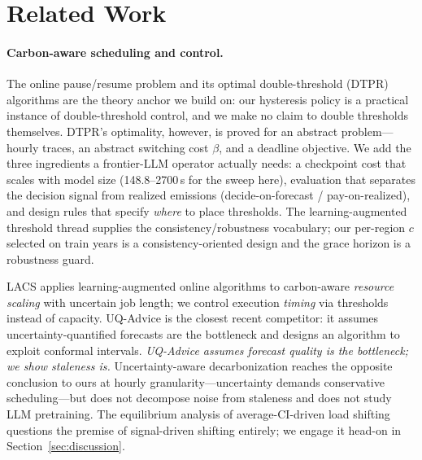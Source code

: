 \documentclass[sigconf,nonacm=false]{acmart}
\begin{document}
\section{Related Work}
\label{sec:related}

\paragraph{Carbon-aware scheduling and control.}
The online pause/resume problem and its optimal double-threshold (DTPR)
algorithms \cite{lechowicz2023opr} are the theory anchor we build on: our
hysteresis policy is a practical instance of double-threshold control, and we
make no claim to double thresholds themselves. DTPR's optimality, however, is
proved for an abstract problem---hourly traces, an abstract switching cost
$\beta$, and a deadline objective. We add the three ingredients a frontier-LLM
operator actually needs: a checkpoint cost that scales with model size
(148.8--2700\,s for the sweep here), evaluation that separates the decision signal
from realized emissions (decide-on-forecast / pay-on-realized), and design rules
that specify \emph{where} to place thresholds. The learning-augmented threshold
thread \cite{lechowicz2024ocs,lykouris2021caching,lechowicz2025stclip} supplies
the consistency/robustness vocabulary; our per-region $c$ selected on train years
is a consistency-oriented design and the grace horizon is a robustness guard.

LACS \cite{bostandoost2024lacs} applies learning-augmented online algorithms to
carbon-aware \emph{resource scaling} with uncertain job length; we control
execution \emph{timing} via thresholds instead of capacity. UQ-Advice
\cite{johnson2025uqadvice} is the closest recent competitor: it assumes
uncertainty-quantified forecasts are the bottleneck and designs an algorithm to
exploit conformal intervals. \emph{UQ-Advice assumes forecast quality is the
bottleneck; we show staleness is.} Uncertainty-aware decarbonization
\cite{li2024uncertainty} reaches the opposite conclusion to ours at hourly
granularity---uncertainty demands conservative scheduling---but does not
decompose noise from staleness and does not study LLM pretraining. The equilibrium
analysis of average-CI-driven load shifting \cite{jiang2026equilibrium} questions
the premise of signal-driven shifting entirely; we engage it head-on in
Section~\ref{sec:discussion}.
\end{document}
